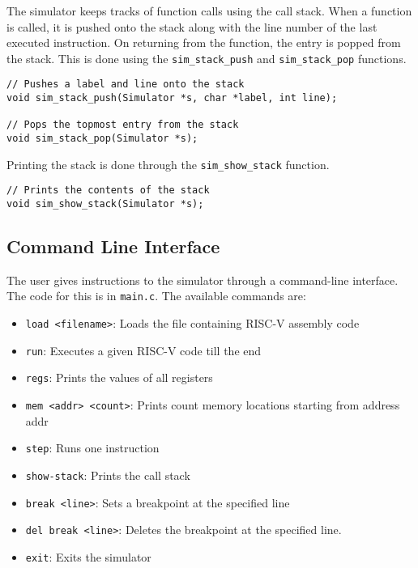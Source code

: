 \documentclass{article}
\begin{document}
The simulator keeps tracks of function calls using the call stack. When a function is called, it
is pushed onto the stack along with the line number of the last executed instruction. On returning
from the function, the entry is popped from the stack. This is done using the \texttt{sim\_stack\_push}
and \texttt{sim\_stack\_pop} functions.

\begin{verbatim}
// Pushes a label and line onto the stack
void sim_stack_push(Simulator *s, char *label, int line);

// Pops the topmost entry from the stack
void sim_stack_pop(Simulator *s);
\end{verbatim}

Printing the stack is done through the \texttt{sim\_show\_stack} function.

\begin{verbatim}
// Prints the contents of the stack
void sim_show_stack(Simulator *s);
\end{verbatim}

\subsection{Command Line Interface}

The user gives instructions to the simulator through a command-line interface. The code for this is in
\texttt{main.c}. The available commands are:

\begin{itemize}
    \item \texttt{load <filename>}: Loads the file containing RISC-V assembly code
    \item \texttt{run}: Executes a given RISC-V code till the end
    \item \texttt{regs}: Prints the values of all registers
    \item \texttt{mem <addr> <count>}: Prints count memory locations starting from address addr
    \item \texttt{step}: Runs one instruction
    \item \texttt{show-stack}: Prints the call stack
    \item \texttt{break <line>}: Sets a breakpoint at the specified line
    \item \texttt{del break <line>}: Deletes the breakpoint at the specified line.
    \item \texttt{exit}: Exits the simulator 
\end{itemize}
\end{document}
